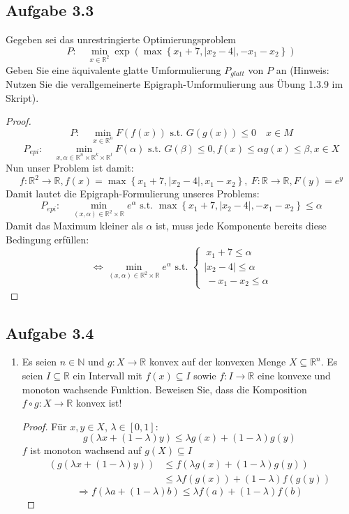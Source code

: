 \documentclass[12pt]{extreport} %
\newcommand{\N}{\mathbb{N}}
\newcommand{\R}{\mathbb{R}}
\theoremstyle{named}
\theoremstyle{nnamed}
\theoremstyle{itshape}
\theoremstyle{normal}
\begin{document}
\subsection*{Aufgabe 3.3}

Gegeben sei das unrestringierte Optimierungsproblem
	$$ P: \quad \min_{x \in \R^2} \exp \left( \max \left\{ x_1 + 7, \left| x_2 -4 \right|,-x_1 - x_2 \right\} \right)  $$
Geben Sie eine äquivalente glatte Umformulierung $P_{glatt}$ von $P$ an (Hinweis: Nutzen Sie die verallgemeinerte Epigraph-Umformulierung aus Übung 1.3.9 im Skript).

	\begin{proof}
		$$ P: \quad \min_{x \in \R^n} F(f(x)) \text{ s.t. } G(g(x)) \leq 0 \quad x \in M $$
		$$ P_{epi}: \quad \min_{x, \alpha \in \R^n \times \R^k \times \R^l} F(\alpha) \text{ s.t. } G(\beta) \leq 0, f(x) \leq \alpha g(x) \leq \beta, x \in X $$
		Nun unser Problem ist damit:
		$$ f \colon \R^2 \rightarrow \R, f(x) = \max \left\{ x_1 + 7, \left| x_2 - 4 \right|, x_1 - x_2 \right\}, ~F \colon \R \rightarrow \R, F(y) = e^y $$
		Damit lautet die Epigraph-Formulierung unseres Problems:
		$$ P_{epi}: \quad \min_{(x, \alpha) \in \R^2 \times \R} e^\alpha \text{ s.t. } \max \left\{ x_1 + 7, \left| x_2 - 4 \right|, - x_1 - x_2 \right\} \leq \alpha $$
		Damit das Maximum kleiner als $\alpha$ ist, muss jede Komponente bereits diese Bedingung erfüllen:
		$$ \iff \min_{(x , \alpha) \in \R^2 \times \R} e^{\alpha} \text{ s.t. } \begin{cases}
 	 ~x_1 + 7 \leq \alpha \\ |x_2 - 4| \leq \alpha \\ ~-x_1 - x_2 \leq \alpha \end{cases} $$
	\end{proof}

\subsection*{Aufgabe 3.4}

\begin{enumerate}
	\item Es seien $n \in \N$ und $g \colon X \rightarrow \R$ konvex auf der konvexen Menge $X \subseteq \R^n$. Es seien $I \subseteq \R$ ein Intervall mit $f(x) \subseteq I$ sowie $f \colon I \rightarrow \R$ eine konvexe und monoton wachsende Funktion. Beweisen Sie, dass die Komposition $f \circ g \colon X \rightarrow \R$ konvex ist!

		\begin{proof}
			Für $x, y \in X$, $\lambda \in [0, 1]$:
				$$ g \left( \lambda x + (1 - \lambda) y \right) \leq \lambda g(x) + (1 - \lambda) g(y) $$
			$f$ ist monoton wachsend auf $g(X) \subseteq I$
			\begin{align*}
				\left( g \left( \lambda x + (1 - \lambda) y \right) \right) & \leq f \left( \lambda g(x) + (1 - \lambda) g(y) \right)  \\
					& \leq \lambda f(g(x)) + (1 - \lambda) f(g(y))
			\end{align*} 
			$$ \Rightarrow f \left( \lambda a + (1 - \lambda) b \right) \leq \lambda f(a) + (1 - \lambda) f(b) $$
		\end{proof}
\end{enumerate}

\end{document}
